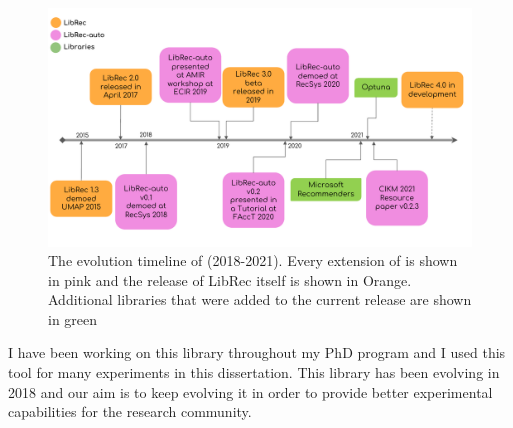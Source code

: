 \begin{figure}[ht!]
    \centering
    \includegraphics[width=0.95\linewidth]{imgs/la/librec-auto-evolution.pdf}
    \caption{The evolution timeline of \libauto{} (2018-2021). Every extension of \libauto{} is shown in pink and the release of LibRec itself is shown in Orange. Additional libraries that were added to the current release are shown in green}
    \label{fig:librec-auto-evolution}
    \vspace{-0.15in}
\end{figure}

I have been working on this library throughout my PhD program and I used this tool for many experiments in this dissertation. 
This library has been evolving in 2018 and our aim is to keep evolving it in order to provide better experimental capabilities for the research community. 